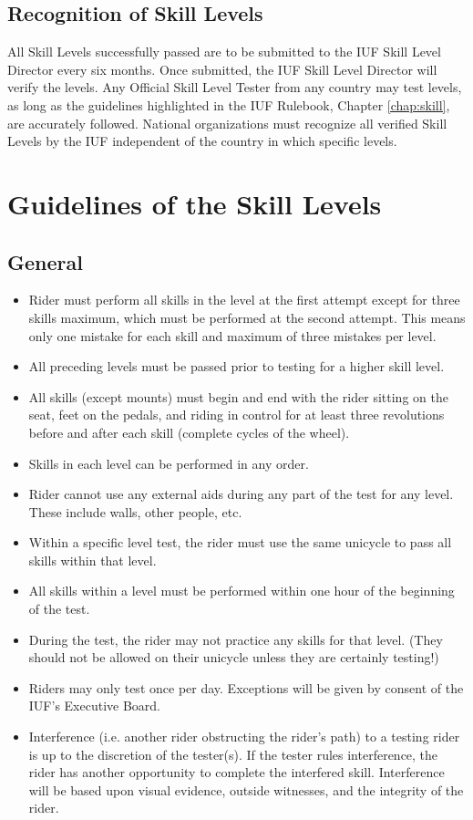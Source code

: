 \subsection{Recognition of Skill Levels}
All Skill Levels successfully passed are to be submitted to the IUF Skill Level Director every six months.
Once submitted, the IUF Skill Level Director will verify the levels.
Any Official Skill Level Tester from any country may test levels, as long as the guidelines highlighted in the IUF Rulebook, Chapter \ref{chap:skill}, are accurately followed.
National organizations must recognize all verified Skill Levels by the IUF independent of the country in which specific levels.

\section{Guidelines of the Skill Levels}

\subsection{General}
\begin{itemize}
\item Rider must perform all skills in the level at the first attempt except for three skills maximum, which must be performed at the second attempt.
This means only one mistake for each skill and maximum of three mistakes per
level.
\item All preceding levels must be passed prior to testing for a higher skill level.
\item All skills (except mounts) must begin and end with the rider sitting on the seat, feet on the pedals, and riding in control for at least three revolutions before and after each skill (complete cycles of the wheel).
\item Skills in each level can be performed in any order.
\item Rider cannot use any external aids during any part of the test for any level.
These include walls, other people, etc.
\item Within a specific level test, the rider must use the same unicycle to pass all skills within that level.
\item All skills within a level must be performed within one hour of the beginning of the test.
\item During the test, the rider may not practice any skills for that level.
(They should not be allowed on their unicycle unless they are certainly testing!)
\item Riders may only test once per day.
Exceptions will be given by consent of the IUF's Executive Board.
\item Interference (i.e. another rider obstructing the rider's path) to a testing rider is up to the discretion of the tester(s).
If the tester rules interference, the rider has another opportunity to complete the interfered skill.
Interference will be based upon visual evidence, outside witnesses, and the integrity of the rider.
\end{itemize}

